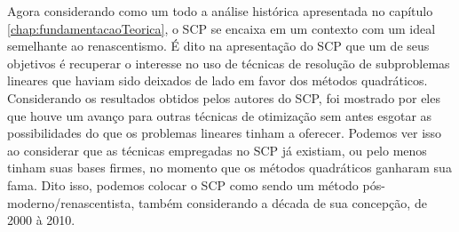 Agora considerando como um todo a análise histórica apresentada no capítulo
\ref{chap:fundamentacaoTeorica}, o SCP se encaixa em um contexto com um ideal
semelhante ao renascentismo. É dito na apresentação do SCP que um de seus objetivos
é recuperar o interesse no uso de técnicas de resolução de subproblemas lineares
que haviam sido deixados de lado em favor dos métodos quadráticos. Considerando
os resultados obtidos pelos autores do SCP, foi mostrado por eles que houve
um avanço para outras técnicas de otimização sem antes esgotar as possibilidades
do que os problemas lineares tinham a oferecer. Podemos ver isso ao considerar
que as técnicas empregadas no SCP já existiam, ou pelo menos tinham suas bases
firmes, no momento que os métodos quadráticos ganharam sua fama. Dito isso, podemos
colocar o SCP como sendo um método pós-moderno/renascentista, também considerando
a década de sua concepção, de 2000 à 2010.

